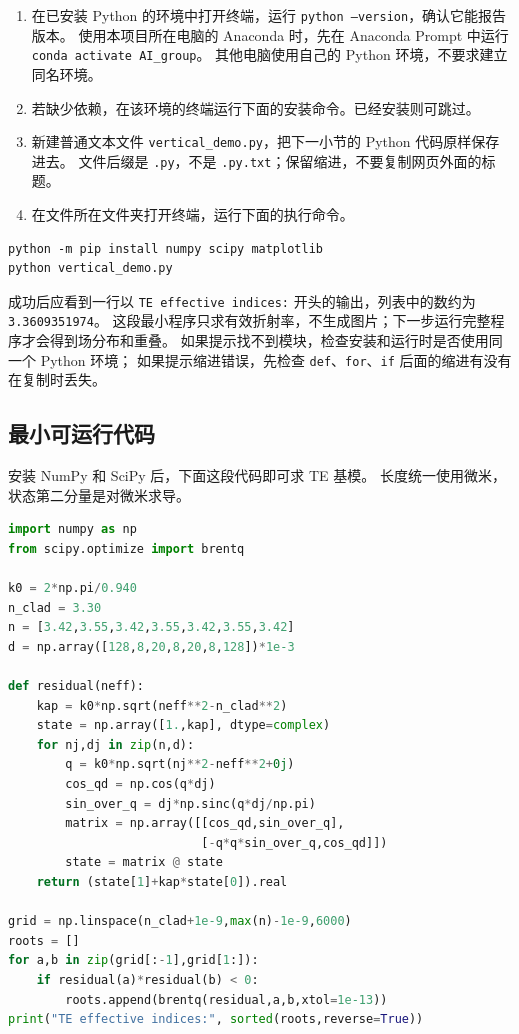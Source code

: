 \begin{enumerate}
  \item 在已安装 Python 的环境中打开终端，运行 \texttt{python --version}，确认它能报告版本。
  使用本项目所在电脑的 Anaconda 时，先在 Anaconda Prompt 中运行 \texttt{conda activate AI\_group}。
  其他电脑使用自己的 Python 环境，不要求建立同名环境。
  \item 若缺少依赖，在该环境的终端运行下面的安装命令。已经安装则可跳过。
  \item 新建普通文本文件 \texttt{vertical\_demo.py}，把下一小节的 Python 代码原样保存进去。
  文件后缀是 \texttt{.py}，不是 \texttt{.py.txt}；保留缩进，不要复制网页外面的标题。
  \item 在文件所在文件夹打开终端，运行下面的执行命令。
\end{enumerate}
\begin{lstlisting}[basicstyle=\ttfamily\small,columns=fullflexible,keepspaces=true,breaklines=true]
python -m pip install numpy scipy matplotlib
python vertical_demo.py
\end{lstlisting}
成功后应看到一行以 \texttt{TE effective indices:} 开头的输出，列表中的数约为 \texttt{3.3609351974}。
这段最小程序只求有效折射率，不生成图片；下一步运行完整程序才会得到场分布和重叠。
如果提示找不到模块，检查安装和运行时是否使用同一个 Python 环境；
如果提示缩进错误，先检查 \texttt{def}、\texttt{for}、\texttt{if} 后面的缩进有没有在复制时丢失。

\subsection{最小可运行代码}
安装 NumPy 和 SciPy 后，下面这段代码即可求 TE 基模。
长度统一使用微米，状态第二分量是对微米求导。
\begin{lstlisting}[language=Python,basicstyle=\ttfamily\small,columns=fullflexible,keepspaces=true,showstringspaces=false,breaklines=true]
import numpy as np
from scipy.optimize import brentq

k0 = 2*np.pi/0.940
n_clad = 3.30
n = [3.42,3.55,3.42,3.55,3.42,3.55,3.42]
d = np.array([128,8,20,8,20,8,128])*1e-3

def residual(neff):
    kap = k0*np.sqrt(neff**2-n_clad**2)
    state = np.array([1.,kap], dtype=complex)
    for nj,dj in zip(n,d):
        q = k0*np.sqrt(nj**2-neff**2+0j)
        cos_qd = np.cos(q*dj)
        sin_over_q = dj*np.sinc(q*dj/np.pi)
        matrix = np.array([[cos_qd,sin_over_q],
                           [-q*q*sin_over_q,cos_qd]])
        state = matrix @ state
    return (state[1]+kap*state[0]).real

grid = np.linspace(n_clad+1e-9,max(n)-1e-9,6000)
roots = []
for a,b in zip(grid[:-1],grid[1:]):
    if residual(a)*residual(b) < 0:
        roots.append(brentq(residual,a,b,xtol=1e-13))
print("TE effective indices:", sorted(roots,reverse=True))
\end{lstlisting}

